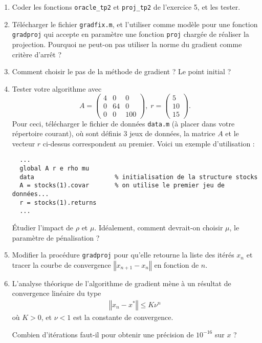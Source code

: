 \documentclass[10pt,a4paper,fleqn]{report}
\begin{document}
\begin{enumerate}
\item Coder les fonctions \verb+oracle_tp2+ et \verb+proj_tp2+
    de l'exercice 5, et les tester.
\item Télécharger le fichier \verb+gradfix.m+, et l'utiliser comme
  modèle pour une fonction \verb+gradproj+ qui accepte en paramètre
  une fonction \verb+proj+ chargée de réaliser la projection.
  Pourquoi ne peut-on pas utiliser la norme du gradient comme critère d'arrêt ?
\item Comment choisir le pas de la méthode de gradient ? Le point
  initial ?
\item Tester votre algorithme avec
    \[A =
  \begin{pmatrix}
    4&0&0\\0&64&0\\0&0&100
  \end{pmatrix},\;r =
  \begin{pmatrix}
    5\\10\\15
  \end{pmatrix}.\]
  Pour ceci, télécharger le fichier de données \verb+data.m+ (à placer dans votre répertoire
  courant), où sont définis 3 jeux de données, la matrice $A$ et le vecteur $r$ ci-dessus
  correspondent au premier. Voici un exemple d'utilisation :
  \begin{verbatim}
  ...
  global A r e rho mu
  data                      % initialisation de la structure stocks
  A = stocks(1).covar       % on utilise le premier jeu de données...
  r = stocks(1).returns
  ...
  \end{verbatim}

  Étudier l'impact de $\rho$ et $\mu$. Idéalement, comment devrait-on choisir $\mu$, le paramètre de
  pénalisation ?
\item Modifier la procédure \verb+gradproj+ pour qu'elle retourne la
  liste des itérés $x_{n}$ et tracer la courbe de convergence
  $\left\Vert x_{n+1} - x_{n}\right\Vert$ en fonction de $n$.
\item L'analyse théorique de l'algorithme de gradient mène à un
  résultat de convergence linéaire du type
  \begin{align*}
    \left\Vert x_{n} - x^{*}\right\Vert \leq K \nu^{n}
  \end{align*}
  où $K > 0$, et $\nu < 1$ est la constante de convergence.

  Combien d'itérations faut-il pour obtenir une précision de
  $10^{-16}$ sur $x$ ?


\end{enumerate}
\end{document}
